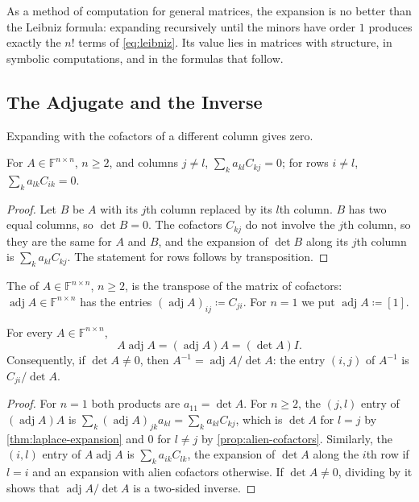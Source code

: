 As a method of computation for general matrices, the expansion is no better than the Leibniz formula: expanding recursively until the minors have order $1$ produces exactly the $n!$ terms of \eqref{eq:leibniz}. Its value lies in matrices with structure, in symbolic computations, and in the formulas that follow.

\subsection{The Adjugate and the Inverse}

Expanding with the cofactors of a different column gives zero.

\begin{proposition}
\label{prop:alien-cofactors}
For $A\in\mathbb F^{n\times n}$, $n\ge2$, and columns $j\ne l$, $\sum_ka_{kl}C_{kj}=0$; for rows $i\ne l$, $\sum_ka_{lk}C_{ik}=0$.
\end{proposition}

\begin{proof}
Let $B$ be $A$ with its $j$th column replaced by its $l$th column. $B$ has two equal columns, so $\det B=0$. The cofactors $C_{kj}$ do not involve the $j$th column, so they are the same for $A$ and $B$, and the expansion of $\det B$ along its $j$th column is $\sum_ka_{kl}C_{kj}$. The statement for rows follows by transposition.
\end{proof}

\begin{definition}[Adjugate]
\label{def:adjugate}
The  of $A\in\mathbb F^{n\times n}$, $n\ge2$, is the transpose of the matrix of cofactors: $\operatorname{adj}A\in\mathbb F^{n\times n}$ has the entries $(\operatorname{adj}A)_{ij}\coloneqq C_{ji}$. For $n=1$ we put $\operatorname{adj}A\coloneqq[1]$.
\end{definition}

\begin{theorem}
\label{thm:adjugate}
For every $A\in\mathbb F^{n\times n}$,
\[
A\operatorname{adj}A=(\operatorname{adj}A)A=(\det A)I .
\]
Consequently, if $\det A\ne0$, then $A^{-1}=\operatorname{adj}A/\det A$: the entry $(i,j)$ of $A^{-1}$ is $C_{ji}/\det A$.
\end{theorem}

\begin{proof}
For $n=1$ both products are $a_{11}=\det A$. For $n\ge2$, the $(j,l)$ entry of $(\operatorname{adj}A)A$ is $\sum_k(\operatorname{adj}A)_{jk}a_{kl}=\sum_ka_{kl}C_{kj}$, which is $\det A$ for $l=j$ by \cref{thm:laplace-expansion} and $0$ for $l\ne j$ by \cref{prop:alien-cofactors}. Similarly, the $(i,l)$ entry of $A\operatorname{adj}A$ is $\sum_ka_{ik}C_{lk}$, the expansion of $\det A$ along the $i$th row if $l=i$ and an expansion with alien cofactors otherwise. If $\det A\ne0$, dividing by it shows that $\operatorname{adj}A/\det A$ is a two-sided inverse.
\end{proof}

